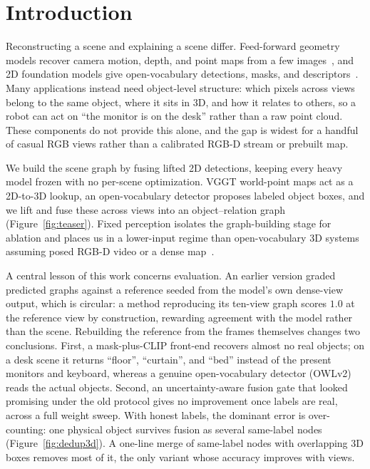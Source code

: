 \section{Introduction}



Reconstructing a scene and explaining a scene differ. Feed-forward geometry models
recover camera motion, depth, and point maps from a few
images~\cite{wang2024dust3r,leroy2024mast3r,wang2025vggt}, and 2D foundation models give
open-vocabulary detections, masks, and
descriptors~\cite{minderer2023owlv2,radford2021clip,kirillov2023segment,oquab2023dinov2}. Many
applications instead need object-level structure: which pixels across views belong to the same
object, where it sits in 3D, and how it relates to others, so a robot can act on
``the monitor is on the desk'' rather than a raw point cloud. These components do not provide
this alone, and the gap is widest for a handful of casual RGB views rather than a
calibrated RGB-D stream or prebuilt map.

We build the scene graph by fusing lifted 2D detections, keeping every heavy model frozen with no
per-scene optimization. VGGT world-point maps act as a 2D-to-3D lookup, an open-vocabulary detector
proposes labeled object boxes, and we lift and fuse these across views into an object--relation graph
(Figure~\ref{fig:teaser}). Fixed perception isolates the graph-building stage for ablation and
places us in a lower-input regime than open-vocabulary 3D systems assuming posed RGB-D video
or a dense map~\cite{gu2024conceptgraphs,jatavallabhula2023conceptfusion}.

A central lesson of this work concerns evaluation. An earlier version graded
predicted graphs against a reference seeded from the model's own dense-view output, which is circular: a
method reproducing its ten-view graph scores $1.0$ at the reference view by construction, rewarding
agreement with the model rather than the scene. Rebuilding the
reference from the frames themselves changes two conclusions. First, a mask-plus-CLIP front-end recovers
almost no real objects; on a desk scene it returns ``floor'', ``curtain'', and ``bed''
instead of the present monitors and keyboard, whereas a genuine open-vocabulary detector
(OWLv2) reads the actual objects. Second, an uncertainty-aware fusion gate that looked promising
under the old protocol gives no improvement once labels are real, across a full weight sweep.
With honest labels, the dominant error is over-counting: one physical object survives
fusion as several same-label nodes (Figure~\ref{fig:dedup3d}). A one-line merge of same-label nodes
with overlapping 3D boxes removes most of it, the only variant whose accuracy improves with views.


